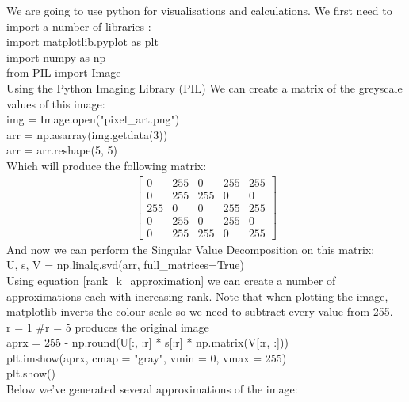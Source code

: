 \documentclass[a4paper,12pt]{article}
\newenvironment{code}{\ttfamily\\}{\\}
\newenvironment{scode}{\vspace{10pt} \begin{code}}{\vspace{10pt} \end{code}}
\begin{document}
	\noindent We are going to use python for visualisations and calculations. We first need to import a number of libraries \cite{python_matplotlib} \cite{python_numpy} \cite{python_pil}:
	\begin{scode}
		import matplotlib.pyplot as plt \\
		import numpy as np \\
		from PIL import Image 
	\end{scode} 
	Using the Python Imaging Library (PIL) We can create a matrix of the greyscale values of this image:
	\begin{scode}
		img = Image.open("pixel\_art.png")  \\
		arr = np.asarray(img.getdata(3)) \\
		arr = arr.reshape(5, 5)
	\end{scode}
	Which will produce the following matrix:
	\begin{align}
		\begin{bmatrix}
			0 & 255 & 0 & 255 & 255 \\
			0 & 255 & 255 & 0 & 0 \\
			255 & 0 & 0 & 255 & 255 \\
			0 & 255 & 0 & 255 & 0 \\
			0 & 255 & 255 & 0 & 255
		\end{bmatrix}
	\end{align}
	And now we can perform the Singular Value Decomposition on this matrix: 
	\begin{scode}
		U, s, V = np.linalg.svd(arr, full\_matrices=True)
	\end{scode}
	Using equation \ref{rank_k_approximation} we can create a number of approximations each with increasing rank. Note that when plotting the image, matplotlib inverts the colour scale so we need to subtract every value from 255. 
	\begin{scode}
		r = 1 \#r = 5 produces the original image \\
		aprx = 255 - np.round(U[:, :r] * s[:r] * np.matrix(V[:r, :])) \\
		plt.imshow(aprx, cmap = "gray", vmin = 0, vmax = 255) \\
		plt.show()
	\end{scode}
	Below we've generated several approximations of the image:
	\\\\
\end{document}
